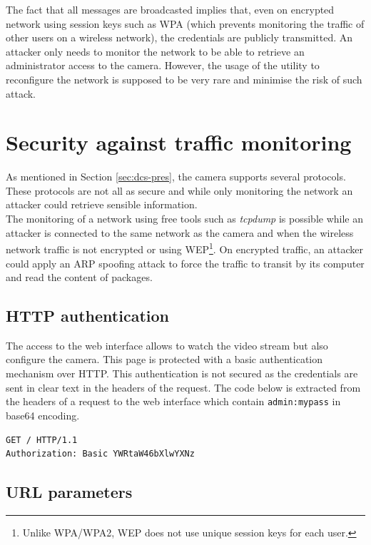 The fact that all messages are broadcasted implies that, even on encrypted network using session keys such as WPA (which prevents monitoring the traffic of other users on a wireless network), the credentials are publicly transmitted.
An attacker only needs to monitor the network to be able to retrieve an administrator access to the camera.
However, the usage of the utility to reconfigure the network is supposed to be very rare and minimise the risk of such attack.

\section{Security against traffic monitoring}
\label{sec:dcs-proto}

As mentioned in Section \ref{sec:dcs-pres}, the camera supports several protocols.
These protocols are not all as secure and while only monitoring the network an attacker could retrieve sensible information.\\

The monitoring of a network using free tools such as \emph{tcpdump} is possible while an attacker is connected to the same network as the camera and when the wireless network traffic is not encrypted or using WEP\footnote{Unlike WPA/WPA2, WEP does not use unique session keys for each user.}.
On encrypted traffic, an attacker could apply an ARP spoofing attack to force the traffic to transit by its computer and read the content of packages.

\subsection{HTTP authentication}

The access to the web interface allows to watch the video stream but also configure the camera.
This page is protected with a basic authentication mechanism over HTTP.
This authentication is not secured as the credentials are sent in clear text in the headers of the request.
The code below is extracted from the headers of a request to the web interface which contain \texttt{admin:mypass} in base64 encoding.

{\scriptsize
\begin{verbatim}
GET / HTTP/1.1
Authorization: Basic YWRtaW46bXlwYXNz
\end{verbatim}
}

\subsection{URL parameters}

